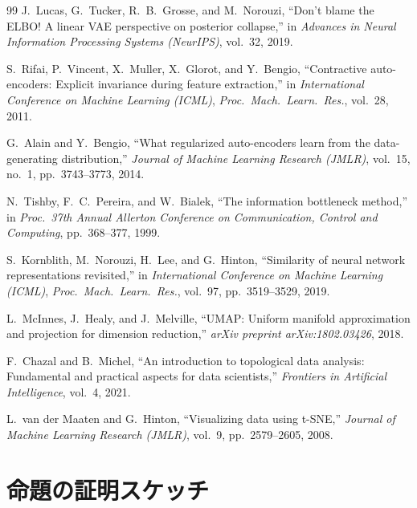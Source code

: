 \documentclass[11pt,a4paper]{jsarticle}
\begin{document}
\begin{thebibliography}{99}
J.~Lucas, G.~Tucker, R.~B.~Grosse, and M.~Norouzi,
``Don't blame the ELBO! A linear VAE perspective on posterior collapse,''
in \textit{Advances in Neural Information Processing Systems (NeurIPS)}, vol.~32, 2019.

S.~Rifai, P.~Vincent, X.~Muller, X.~Glorot, and Y.~Bengio,
``Contractive auto-encoders: Explicit invariance during feature extraction,''
in \textit{International Conference on Machine Learning (ICML)},
\textit{Proc.~Mach.~Learn.~Res.}, vol.~28, 2011.

G.~Alain and Y.~Bengio,
``What regularized auto-encoders learn from the data-generating distribution,''
\textit{Journal of Machine Learning Research (JMLR)}, vol.~15, no.~1,
pp.~3743--3773, 2014.

N.~Tishby, F.~C.~Pereira, and W.~Bialek,
``The information bottleneck method,''
in \textit{Proc.~37th Annual Allerton Conference on Communication, Control and Computing},
pp.~368--377, 1999.

S.~Kornblith, M.~Norouzi, H.~Lee, and G.~Hinton,
``Similarity of neural network representations revisited,''
in \textit{International Conference on Machine Learning (ICML)},
\textit{Proc.~Mach.~Learn.~Res.}, vol.~97, pp.~3519--3529, 2019.

L.~McInnes, J.~Healy, and J.~Melville,
``UMAP: Uniform manifold approximation and projection for dimension reduction,''
\textit{arXiv preprint arXiv:1802.03426}, 2018.

F.~Chazal and B.~Michel,
``An introduction to topological data analysis: Fundamental and practical aspects
for data scientists,''
\textit{Frontiers in Artificial Intelligence}, vol.~4, 2021.

L.~van der Maaten and G.~Hinton,
``Visualizing data using t-SNE,''
\textit{Journal of Machine Learning Research (JMLR)}, vol.~9,
pp.~2579--2605, 2008.

\end{thebibliography}

\appendix

\section{命題の証明スケッチ}\label{app:proofs}
\end{document}
